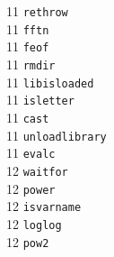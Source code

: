 \begin{footnotesize}
\begin{multicols}{3}
\vspace{-.153cm} 11    \hspace{.2cm} {\tt rethrow             }    \\ %
\vspace{-.153cm} 11    \hspace{.2cm} {\tt fftn                }    \\ %
\vspace{-.153cm} 11    \hspace{.2cm} {\tt feof                }    \\ %
\vspace{-.153cm} 11    \hspace{.2cm} {\tt rmdir               }    \\ %
\vspace{-.153cm} 11    \hspace{.2cm} {\tt libisloaded         }    \\ %
\vspace{-.153cm} 11    \hspace{.2cm} {\tt isletter            }    \\ %
\vspace{-.153cm} 11    \hspace{.2cm} {\tt cast                }    \\ %
\vspace{-.153cm} 11    \hspace{.2cm} {\tt unloadlibrary       }    \\ %
\vspace{-.153cm} 11    \hspace{.2cm} {\tt evalc               }    \\ %
\vspace{-.153cm} 12    \hspace{.2cm} {\tt waitfor             }    \\ %
\vspace{-.153cm} 12    \hspace{.2cm} {\tt power               }    \\ %
\vspace{-.153cm} 12    \hspace{.2cm} {\tt isvarname           }    \\ %
\vspace{-.153cm} 12    \hspace{.2cm} {\tt loglog              }    \\ %
\vspace{-.153cm} 12    \hspace{.2cm} {\tt pow2                }    \\ %

\end{multicols}
\end{footnotesize}
